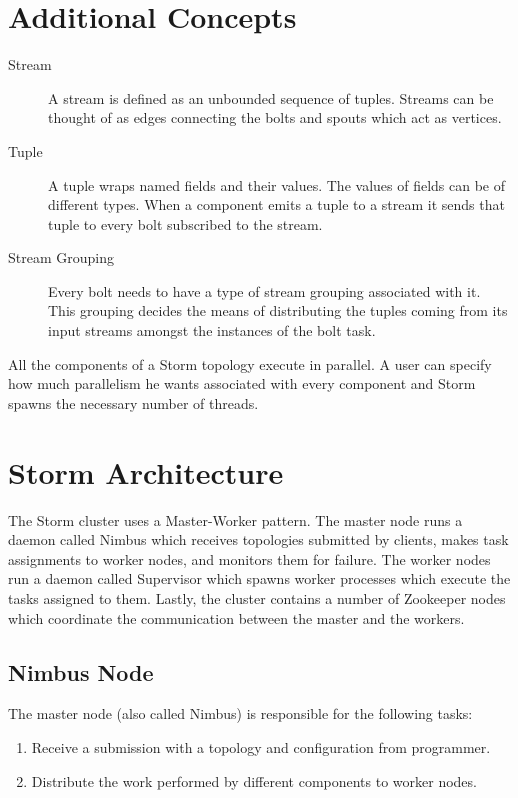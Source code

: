 \documentclass[bsc,logo,frontabs,twoside,singlespacing,normalheadings,parskip]{infthesis}     %
\begin{document}
\section{Additional Concepts}

\begin{description}
  \item[Stream] A stream is defined as an unbounded sequence of tuples. Streams can be thought of as edges connecting the bolts and spouts which act as vertices.
  \item[Tuple] A tuple wraps named fields and their values. The values of fields can be of different types. When a component emits a tuple to a stream it sends that tuple to every bolt subscribed to the stream.
  \item[Stream Grouping] Every bolt needs to have a type of stream grouping associated with it. This grouping decides the means of distributing the tuples coming from its input streams amongst the instances of the bolt task.
\end{description}

All the components of a Storm topology execute in parallel. A user can specify how much parallelism he wants associated with every component and Storm spawns the necessary number of threads.

\section{Storm Architecture}


The Storm cluster uses a Master-Worker pattern. The master node runs a daemon called Nimbus which receives topologies submitted by clients, makes task assignments to worker nodes, and monitors them for failure. The worker nodes run a daemon called Supervisor which spawns worker processes which execute the tasks assigned to them. Lastly, the cluster contains a number of Zookeeper nodes which coordinate the communication between the master and the workers.

\subsection{Nimbus Node}

The master node (also called Nimbus) is responsible for the following tasks:

\begin{enumerate}
	\item Receive a submission with a topology and configuration from programmer.
	\item Distribute the work performed by different components to worker nodes.
\end{enumerate}
\end{document}
